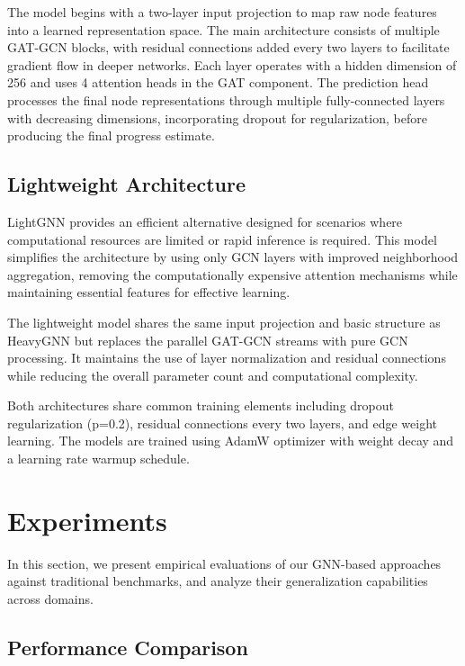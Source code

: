 \documentclass[letterpaper]{article}
\begin{document}
The model begins with a two-layer input projection to map raw node features into a learned representation space. The main architecture consists of multiple GAT-GCN blocks, with residual connections added every two layers to facilitate gradient flow in deeper networks. Each layer operates with a hidden dimension of 256 and uses 4 attention heads in the GAT component. The prediction head processes the final node representations through multiple fully-connected layers with decreasing dimensions, incorporating dropout for regularization, before producing the final progress estimate.

\subsection{Lightweight Architecture}
LightGNN provides an efficient alternative designed for scenarios where computational resources are limited or rapid inference is required. This model simplifies the architecture by using only GCN layers with improved neighborhood aggregation, removing the computationally expensive attention mechanisms while maintaining essential features for effective learning.

The lightweight model shares the same input projection and basic structure as HeavyGNN but replaces the parallel GAT-GCN streams with pure GCN processing. It maintains the use of layer normalization and residual connections while reducing the overall parameter count and computational complexity. 

Both architectures share common training elements including dropout regularization (p=0.2), residual connections every two layers, and edge weight learning. The models are trained using AdamW optimizer with weight decay and a learning rate warmup schedule.

\section{Experiments}
In this section, we present empirical evaluations of our GNN-based approaches against traditional benchmarks, and analyze their generalization capabilities across domains.

\subsection{Performance Comparison}
\end{document}
